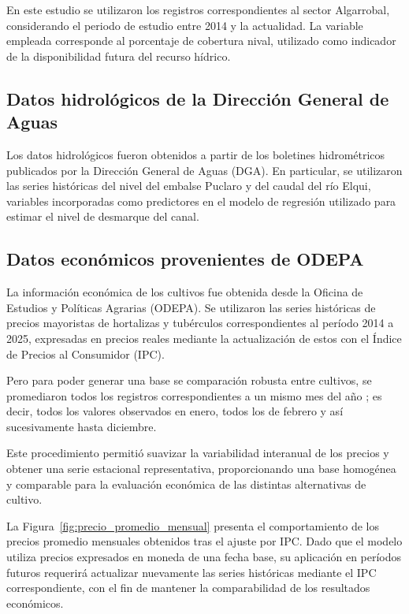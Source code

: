 \documentclass[12pt]{report}
\begin{document}
En este estudio se utilizaron los registros correspondientes al sector Algarrobal, considerando el periodo de estudio entre 2014 y la actualidad. La variable empleada corresponde al porcentaje de cobertura nival, utilizado como indicador de la disponibilidad futura del recurso hídrico.

\subsection{Datos hidrológicos de la Dirección General de Aguas}

Los datos hidrológicos fueron obtenidos a partir de los boletines hidrométricos publicados por la Dirección General de Aguas (DGA). En particular, se utilizaron las series históricas del nivel del embalse Puclaro y del caudal del río Elqui, variables incorporadas como predictores en el modelo de regresión utilizado para estimar el nivel de desmarque del canal.

\subsection{Datos económicos provenientes de ODEPA}

La información económica de los cultivos fue obtenida desde la Oficina de Estudios y Políticas Agrarias (ODEPA). Se utilizaron las series históricas de precios mayoristas de hortalizas y tubérculos correspondientes al período 2014 a 2025, expresadas en precios reales mediante la actualización de estos con el Índice de Precios al Consumidor (IPC).


Pero para poder generar una base se comparación robusta entre cultivos, se promediaron todos los registros correspondientes a un mismo mes del año ; es decir, todos los valores observados en enero, todos los de febrero y así sucesivamente hasta diciembre.

Este procedimiento permitió suavizar la variabilidad interanual de los precios y obtener una serie estacional representativa, proporcionando una base homogénea y comparable para la evaluación económica de las distintas alternativas de cultivo. 
 
 La Figura~\ref{fig:precio_promedio_mensual} presenta el comportamiento de los precios promedio mensuales obtenidos tras el ajuste por IPC. Dado que el modelo utiliza precios expresados en moneda de una fecha base, su aplicación en períodos futuros requerirá actualizar nuevamente las series históricas mediante el IPC correspondiente, con el fin de mantener la comparabilidad de los resultados económicos. 
\end{document}
